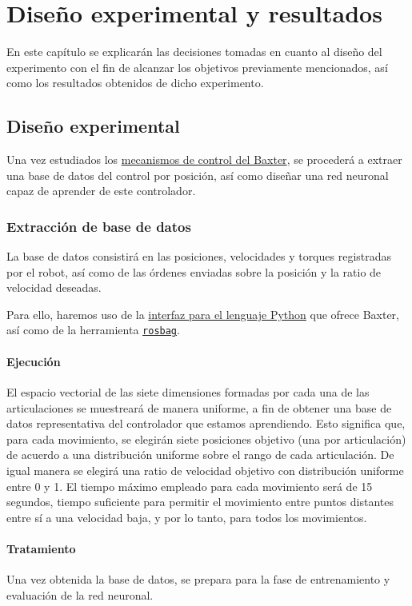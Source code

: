 \chapter{Diseño experimental y resultados}
En este capítulo se explicarán las decisiones tomadas en cuanto al diseño del experimento con el fin de alcanzar los objetivos previamente mencionados, así como los resultados obtenidos de dicho experimento.
\section{Diseño experimental}
Una vez estudiados los \hyperref[subsec:metodos/control_baxter]{mecanismos de control del Baxter}, se procederá a extraer una base de datos del control por posición, así como diseñar una red neuronal capaz de aprender de este controlador.

\subsection{Extracción de base de datos}
La base de datos consistirá en las posiciones, velocidades y torques registradas por el robot, así como de las órdenes enviadas sobre la posición y la ratio de velocidad deseadas.

Para ello, haremos uso de la \hyperref[subsubsec:metodos/pythonAPI]{interfaz para el lenguaje Python} que ofrece Baxter, así como de la herramienta \hyperref[subsec:metodos/rosbag]{\texttt{rosbag}}.
\subsubsection{Ejecución}
El espacio vectorial de las siete dimensiones formadas por cada una de las articulaciones se muestreará de manera uniforme, a fin de obtener una base de datos representativa del controlador que estamos aprendiendo. Esto significa que, para cada movimiento, se elegirán siete posiciones objetivo (una por articulación) de acuerdo a una distribución uniforme sobre el rango de cada articulación. De igual manera se elegirá una ratio de velocidad objetivo con distribución uniforme entre 0 y 1. El tiempo máximo empleado para cada movimiento será de 15 segundos, tiempo suficiente para permitir el movimiento entre puntos distantes entre sí a una velocidad baja, y por lo tanto, para todos los movimientos.

\subsubsection{Tratamiento}
Una vez obtenida la base de datos, se prepara para la fase de entrenamiento y evaluación de la red neuronal.

